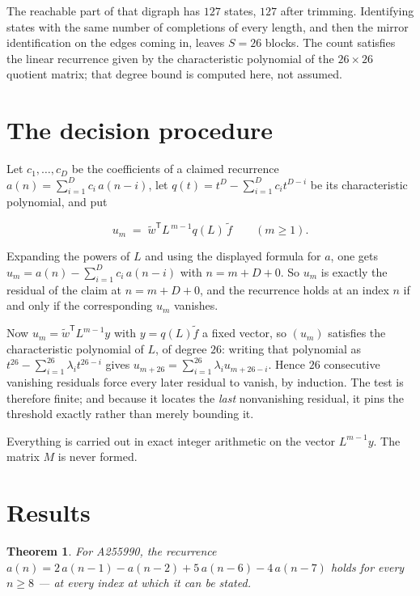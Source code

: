 \documentclass[11pt]{article}
\newtheorem{theorem}{Theorem}
\theoremstyle{definition}
\begin{document}
The reachable part of that digraph has $127$ states, $127$ after trimming. Identifying states with the same number of completions of every length, and then the mirror identification on the edges coming in, leaves $S = 26$ blocks. The count satisfies the linear recurrence given by the characteristic polynomial of the $26\times26$ quotient matrix; that degree bound is computed here, not assumed.

\section{The decision procedure}

Let $c_1,\dots,c_D$ be the coefficients of a claimed recurrence $a(n) = \sum_{i=1}^{D} c_i\,a(n-i)$, let $q(t) = t^{D} - \sum_{i=1}^{D} c_i t^{D-i}$ be its characteristic polynomial, and put

\[u_m \;=\; \tilde w^{\mathsf T} L^{\,m-1} q(L)\,\tilde f \qquad (m \ge 1).\]

Expanding the powers of $L$ and using the displayed formula for $a$, one gets $u_m = a(n) - \sum_{i=1}^{D} c_i\,a(n-i)$ with $n = m + D + 0$. So $u_m$ is exactly the residual of the claim at $n = m + D + 0$, and the recurrence holds at an index $n$ if and only if the corresponding $u_m$ vanishes.

Now $u_m = \tilde w^{\mathsf T} L^{m-1} y$ with $y = q(L)\tilde f$ a fixed vector, so $(u_m)$ satisfies the characteristic polynomial of $L$, of degree $26$: writing that polynomial as $t^{26} - \sum_{i=1}^{26} \lambda_i t^{26-i}$ gives $u_{m+26} = \sum_{i=1}^{26} \lambda_i u_{m+26-i}$. Hence $26$ consecutive vanishing residuals force every later residual to vanish, by induction. The test is therefore finite; and because it locates the {\itshape last} nonvanishing residual, it pins the threshold exactly rather than merely bounding it.

Everything is carried out in exact integer arithmetic on the vector $L^{m-1}y$. The matrix $M$ is never formed.

\section{Results}

\begin{theorem} For A255990, the recurrence $a(n) = 2\,a(n-1) - a(n-2) + 5\,a(n-6) - 4\,a(n-7)$ holds for every $n \ge 8$ --- at every index at which it can be stated.\end{theorem}
\end{document}
